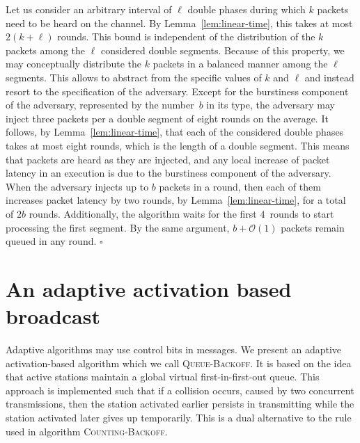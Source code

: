 \documentclass[11pt]{article}
\newcommand{\cO}{{\mathcal O}}
\newcommand{\qed}{\hfill $\square$ \smallbreak}
\newenvironment{proof}{\noindent{\bf Proof:}}{\qed}
\begin{document}
\begin{proof} 
Let us consider an arbitrary interval of $\ell$ double phases during which $k$ packets need to be heard on the channel.
By Lemma~\ref{lem:linear-time}, this takes at most $2(k+\ell)$ rounds.
This bound is independent of the distribution of the $k$ packets among the  $\ell$ considered double segments.
Because of this property, we may conceptually distribute the $k$ packets in a balanced manner among the $\ell$ segments.
This allows to abstract from the specific values of $k$ and $\ell$ and instead resort to the specification of the adversary.
Except for the burstiness component of the adversary, represented by the number~$b$ in its type, the adversary may inject three packets per a double segment of eight rounds on the average.
It follows, by Lemma~\ref{lem:linear-time}, that each of the considered double phases takes at most eight rounds, which is the length of a double segment.
This means that packets are heard as they are injected, and any local increase of packet latency in an execution is due to the burstiness component of the adversary. 
When the adversary injects up to $b$ packets in a round, then each of them  increases packet latency by two rounds, by Lemma~\ref{lem:linear-time}, for a total of $2b$ rounds.
Additionally, the algorithm waits for the first $4$~rounds to start processing the first segment.
By the same argument, $b+\cO(1)$ packets remain queued in any round.
\end{proof} 



\section{An adaptive  activation based broadcast}

\label{sec:adaptive-activation-based}



Adaptive algorithms may use control bits in messages.
We present an adaptive activation-based algorithm which we call \textsc{Queue-Backoff}.
It is based on the idea that active stations maintain a global virtual first-in-first-out queue.
This approach is implemented such that if a collision occurs, caused by two concurrent transmissions, then the station activated earlier persists in transmitting while the station activated later gives up temporarily.
This is a dual alternative to the rule used in algorithm \textsc{Counting-Backoff}.
\end{document}
